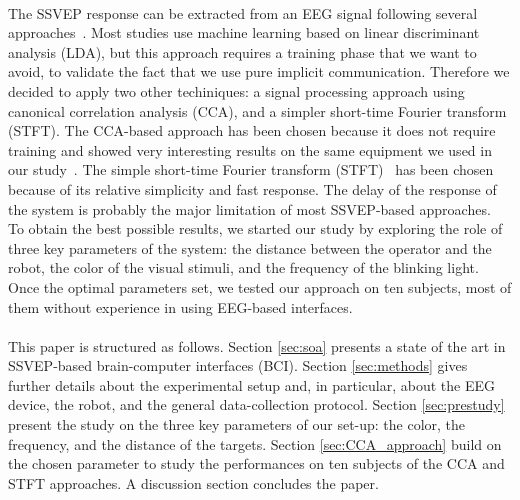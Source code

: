 \documentclass[smallextended]{svjour3}
\begin{document}
\\ 
The SSVEP response can be extracted from an EEG signal following several approaches~\cite{Bi2013}. 
Most studies use machine learning based on linear discriminant analysis (LDA), but this approach requires a training phase that we want to avoid, to validate the fact that we use pure implicit communication.
Therefore we decided to apply two other techiniques: a signal processing approach using canonical correlation analysis (CCA), and a simpler short-time Fourier transform (STFT).
The CCA-based approach has been chosen because it does not require training and showed very interesting results on the same equipment we used in our study~\cite{Lin2014}.
The simple short-time Fourier transform (STFT)~\cite{Durak2003} has been chosen because of its relative simplicity and fast response. The delay of the response of the system is probably the major limitation of most SSVEP-based approaches.\\
To obtain the best possible results, we started our study by exploring the role of three key parameters of the system: the distance between the operator and the robot, the color of the visual stimuli, and the frequency of the blinking light. 
Once the optimal parameters set, we tested our approach on ten subjects, most of them without experience in using EEG-based interfaces. \\
\\
This paper is structured as follows. Section \ref{sec:soa} presents a state of the art in SSVEP-based brain-computer interfaces (BCI). Section \ref{sec:methods} gives further details about the experimental setup and, in particular, about the EEG device, the robot, and the general data-collection protocol. 
Section \ref{sec:prestudy} present the study on the three key parameters of our set-up: the color, the frequency, and the distance of the targets. Section \ref{sec:CCA_approach} build on the chosen parameter to study the performances on ten subjects of the CCA and STFT approaches. A discussion section concludes the paper.
\end{document}
